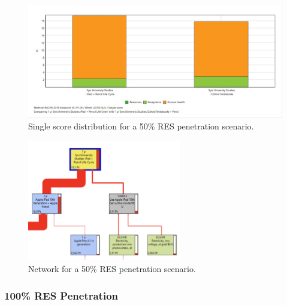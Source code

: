 \begin{figure}[H]
    \centering
    \includegraphics[width=\textwidth]{images/RES_50/Single_Score_RES_50.JPG}
    \caption{Single score distribution for a 50\% RES penetration scenario.}\label{fig:single_score_RES50}
\end{figure}

\begin{figure}[H]
    \centering
    \includegraphics[width=0.6\textwidth]{images/RES_50/50_RES_network.png}
    \caption{Network for a 50\% RES penetration scenario.}\label{fig:50RES_network}
\end{figure}

\subsubsection{100\% RES Penetration}

